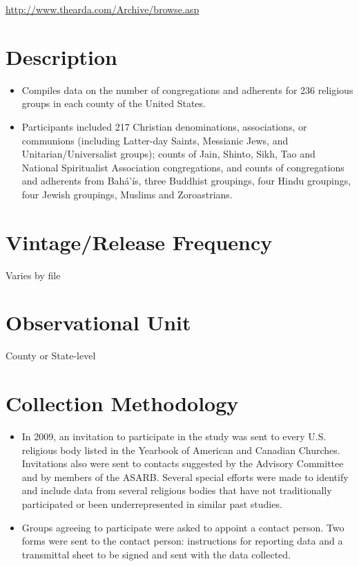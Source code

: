 \documentclass[
]{book}
\providecommand{\tightlist}{%
  \setlength{\itemsep}{0pt}\setlength{\parskip}{0pt}}
\begin{document}
\url{http://www.thearda.com/Archive/browse.asp}

\hypertarget{description-94}{%
\section{Description}\label{description-94}}

\begin{itemize}
\tightlist
\item
  Compiles data on the number of congregations and adherents for 236 religious groups in each county of the United States.
\item
  Participants included 217 Christian denominations, associations, or communions (including Latter-day Saints, Messianic Jews, and Unitarian/Universalist groups); counts of Jain, Shinto, Sikh, Tao and National Spiritualist Association congregations, and counts of congregations and adherents from Bahá'ís, three Buddhist groupings, four Hindu groupings, four Jewish groupings, Muslims and Zoroastrians.
\end{itemize}

\hypertarget{vintagerelease-frequency-94}{%
\section{Vintage/Release Frequency}\label{vintagerelease-frequency-94}}

Varies by file

\hypertarget{observational-unit-94}{%
\section{Observational Unit}\label{observational-unit-94}}

County or State-level

\hypertarget{collection-methodology-94}{%
\section{Collection Methodology}\label{collection-methodology-94}}

\begin{itemize}
\tightlist
\item
  In 2009, an invitation to participate in the study was sent to every U.S. religious body listed in the Yearbook of American and Canadian Churches. Invitations also were sent to contacts suggested by the Advisory Committee and by members of the ASARB. Several special efforts were made to identify and include data from several religious bodies that have not traditionally participated or been underrepresented in similar past studies.
\item
  Groups agreeing to participate were asked to appoint a contact person. Two forms were sent to the contact person: instructions for reporting data and a transmittal sheet to be signed and sent with the data collected.
\end{itemize}
\end{document}
